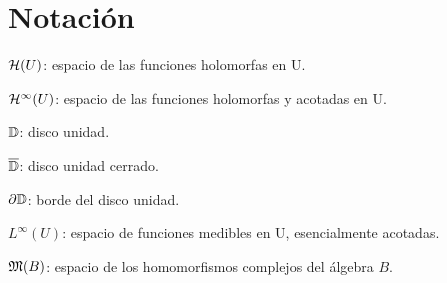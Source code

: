 \chapter{Notación}

$\mathcal{H}(U)$: espacio de las funciones holomorfas en U.

$\mathcal{H}^{\infty}(U)$: espacio de las funciones holomorfas y acotadas en U.

$\mathbb{D}$: disco unidad.

$\overline{\mathbb{D}}$: disco unidad cerrado.

$\partial \mathbb{D}$: borde del disco unidad.

$L^{\infty}(U)$: espacio de funciones medibles en U, esencialmente acotadas.

$\mathfrak{M} (B)$: espacio de los homomorfismos complejos del álgebra $B$.
